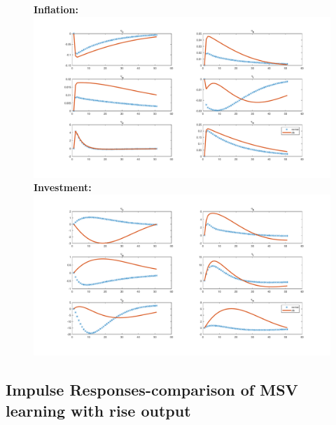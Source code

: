 \documentclass[12pt,reqno]{article}
\numberwithin{equation}{section}
\begin{document}
\begin{figure}[H]
\textbf{Inflation:}\\
\includegraphics[scale=0.5]{rise_impresp_pinf.pdf}
\textbf{Investment:}\\
\includegraphics[scale=0.5]{rise_impresp_inve.pdf}
\end{figure}

\subsection*{Impulse Responses-comparison of MSV learning with rise output}
\end{document}
